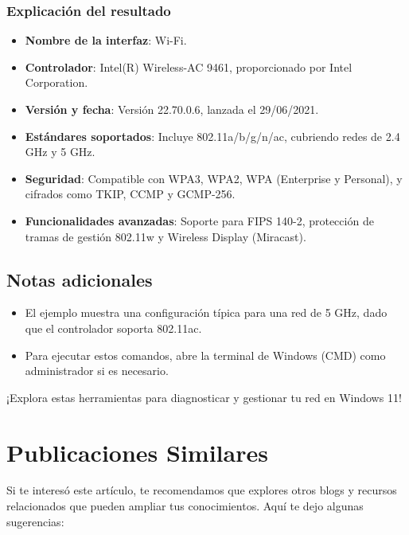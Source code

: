 \documentclass[
  doc,
  floatsintext,
  longtable,
  a4paper,
  nolmodern,
  notxfonts,
  notimes,
  colorlinks=true,linkcolor=blue,citecolor=blue,urlcolor=blue]{apa7}
\providecommand{\tightlist}{%
  \setlength{\itemsep}{0pt}\setlength{\parskip}{0pt}}
\begin{document}
\subsubsection{Explicación del
resultado}\label{explicaciuxf3n-del-resultado}

\begin{itemize}
\tightlist
\item
  \textbf{Nombre de la interfaz}: Wi-Fi.
\item
  \textbf{Controlador}: Intel(R) Wireless-AC 9461, proporcionado por
  Intel Corporation.
\item
  \textbf{Versión y fecha}: Versión 22.70.0.6, lanzada el 29/06/2021.
\item
  \textbf{Estándares soportados}: Incluye 802.11a/b/g/n/ac, cubriendo
  redes de 2.4 GHz y 5 GHz.
\item
  \textbf{Seguridad}: Compatible con WPA3, WPA2, WPA (Enterprise y
  Personal), y cifrados como TKIP, CCMP y GCMP-256.
\item
  \textbf{Funcionalidades avanzadas}: Soporte para FIPS 140-2,
  protección de tramas de gestión 802.11w y Wireless Display (Miracast).
\end{itemize}

\subsection{Notas adicionales}\label{notas-adicionales}

\begin{itemize}
\tightlist
\item
  El ejemplo muestra una configuración típica para una red de 5 GHz,
  dado que el controlador soporta 802.11ac.
\item
  Para ejecutar estos comandos, abre la terminal de Windows (CMD) como
  administrador si es necesario.
\end{itemize}

¡Explora estas herramientas para diagnosticar y gestionar tu red en
Windows 11!

\section{Publicaciones Similares}\label{publicaciones-similares}

Si te interesó este artículo, te recomendamos que explores otros blogs y
recursos relacionados que pueden ampliar tus conocimientos. Aquí te dejo
algunas sugerencias:
\end{document}
